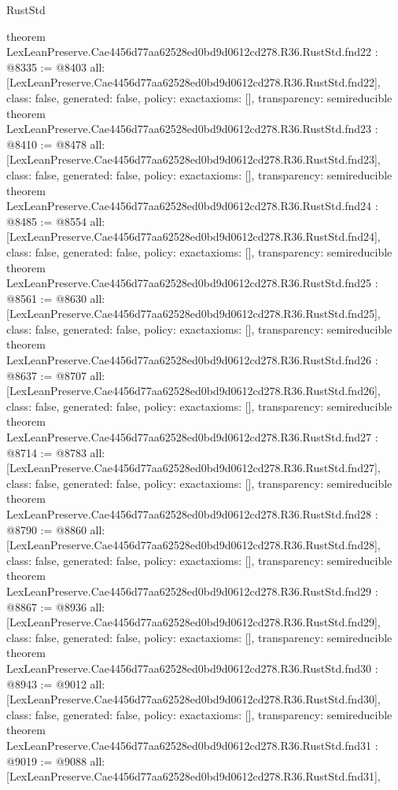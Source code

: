 \begin{lexlean}{RustStd}
\begin{coremodule}
{}
theorem LexLeanPreserve.Cae4456d77aa62528ed0bd9d0612cd278.R36.RustStd.fnd22 : @8335 := @8403 {
  all: [LexLeanPreserve.Cae4456d77aa62528ed0bd9d0612cd278.R36.RustStd.fnd22],
  class: false,
  generated: false,
  policy: exact{axioms: []},
  transparency: semireducible
}
theorem LexLeanPreserve.Cae4456d77aa62528ed0bd9d0612cd278.R36.RustStd.fnd23 : @8410 := @8478 {
  all: [LexLeanPreserve.Cae4456d77aa62528ed0bd9d0612cd278.R36.RustStd.fnd23],
  class: false,
  generated: false,
  policy: exact{axioms: []},
  transparency: semireducible
}
theorem LexLeanPreserve.Cae4456d77aa62528ed0bd9d0612cd278.R36.RustStd.fnd24 : @8485 := @8554 {
  all: [LexLeanPreserve.Cae4456d77aa62528ed0bd9d0612cd278.R36.RustStd.fnd24],
  class: false,
  generated: false,
  policy: exact{axioms: []},
  transparency: semireducible
}
theorem LexLeanPreserve.Cae4456d77aa62528ed0bd9d0612cd278.R36.RustStd.fnd25 : @8561 := @8630 {
  all: [LexLeanPreserve.Cae4456d77aa62528ed0bd9d0612cd278.R36.RustStd.fnd25],
  class: false,
  generated: false,
  policy: exact{axioms: []},
  transparency: semireducible
}
theorem LexLeanPreserve.Cae4456d77aa62528ed0bd9d0612cd278.R36.RustStd.fnd26 : @8637 := @8707 {
  all: [LexLeanPreserve.Cae4456d77aa62528ed0bd9d0612cd278.R36.RustStd.fnd26],
  class: false,
  generated: false,
  policy: exact{axioms: []},
  transparency: semireducible
}
theorem LexLeanPreserve.Cae4456d77aa62528ed0bd9d0612cd278.R36.RustStd.fnd27 : @8714 := @8783 {
  all: [LexLeanPreserve.Cae4456d77aa62528ed0bd9d0612cd278.R36.RustStd.fnd27],
  class: false,
  generated: false,
  policy: exact{axioms: []},
  transparency: semireducible
}
theorem LexLeanPreserve.Cae4456d77aa62528ed0bd9d0612cd278.R36.RustStd.fnd28 : @8790 := @8860 {
  all: [LexLeanPreserve.Cae4456d77aa62528ed0bd9d0612cd278.R36.RustStd.fnd28],
  class: false,
  generated: false,
  policy: exact{axioms: []},
  transparency: semireducible
}
theorem LexLeanPreserve.Cae4456d77aa62528ed0bd9d0612cd278.R36.RustStd.fnd29 : @8867 := @8936 {
  all: [LexLeanPreserve.Cae4456d77aa62528ed0bd9d0612cd278.R36.RustStd.fnd29],
  class: false,
  generated: false,
  policy: exact{axioms: []},
  transparency: semireducible
}
theorem LexLeanPreserve.Cae4456d77aa62528ed0bd9d0612cd278.R36.RustStd.fnd30 : @8943 := @9012 {
  all: [LexLeanPreserve.Cae4456d77aa62528ed0bd9d0612cd278.R36.RustStd.fnd30],
  class: false,
  generated: false,
  policy: exact{axioms: []},
  transparency: semireducible
}
theorem LexLeanPreserve.Cae4456d77aa62528ed0bd9d0612cd278.R36.RustStd.fnd31 : @9019 := @9088 {
  all: [LexLeanPreserve.Cae4456d77aa62528ed0bd9d0612cd278.R36.RustStd.fnd31],
}
\end{coremodule}
\end{lexlean}
